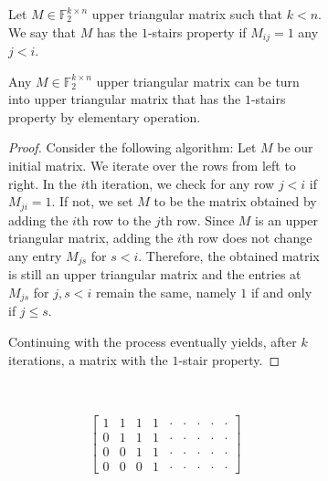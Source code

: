 \documentclass[manuscript,screen,review]{acmart}
\begin{document}
  \begin{figure}[h]
\begin{subfigure}[b]{0.65\textwidth}
\begin{definition}
  Let $M \in \mathbb{F}_{2}^{k \times n }$ upper triangular matrix such that $k<n$. We say that $M$ has the $1$-stairs property if $M_{ij}=1$ any $j<i$. 
\end{definition}
\begin{claim}
  Any $M \in \mathbb{F}_{2}^{k \times n }$ upper triangular matrix can be turn into upper triangular matrix that has the $1$-stairs property by elementary operation.  
\end{claim}
\begin{proof} 
Consider the following algorithm: Let $M$ be our initial matrix. We iterate over the rows from left to right. In the $i$th iteration, we check for any row $j<i$ if $M_{ji} = 1$. If not, we set $M$ to be the matrix obtained by adding the $i$th row to the $j$th row. Since $M$ is an upper triangular matrix, adding the $i$th row does not change any entry $M_{js}$ for $s<i$. Therefore, the obtained matrix is still an upper triangular matrix and the entries at $M_{js}$ for $j,s < i$ remain the same, namely $1$ if and only if $j\le s$. 

Continuing with the process eventually yields, after $k$ iterations, a matrix with the $1$-stair property.
\end{proof}

\end{subfigure}
\begin{subfigure}[b]{0.05\textwidth}
  \
\end{subfigure}
  \begin{subfigure}[h]{0.25\textwidth}

    \begin{equation*}
      \begin{split}
        \begin{bmatrix}
         1 & 1 & 1 & 1 &\cdot & \cdot & \cdot & \cdot & \cdot \\     
         0 & 1 & 1 & 1 &\cdot & \cdot & \cdot & \cdot & \cdot \\     
         0 & 0 & 1 & 1 &\cdot & \cdot & \cdot & \cdot & \cdot \\     
         0 & 0 & 0 & 1 &\cdot & \cdot & \cdot & \cdot & \cdot 
        \end{bmatrix}
      \end{split}
    \end{equation*}

 \end{subfigure}
\end{figure}
\end{document}
